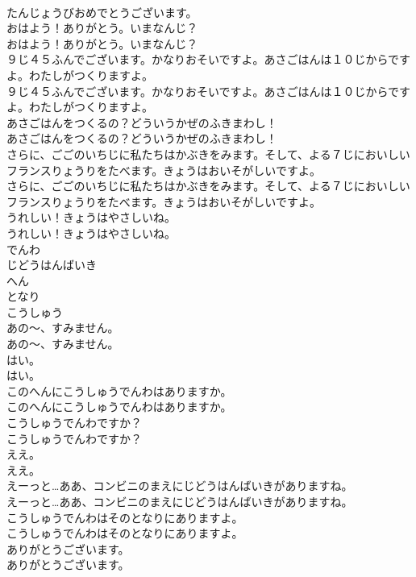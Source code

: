 \documentclass[8pt]{extreport}
\begin{document}
\begin{CJK}{UTF8}{min}
\\	たんじょうびおめでとうございます。 
\\	おはよう！ありがとう。いまなんじ？	
\\	おはよう！ありがとう。いまなんじ？ 
\\	９じ４５ふんでございます。かなりおそいですよ。あさごはんは１０じからですよ。わたしがつくりますよ。	
\\	９じ４５ふんでございます。かなりおそいですよ。あさごはんは１０じからですよ。わたしがつくりますよ。 
\\	あさごはんをつくるの？どういうかぜのふきまわし！	
\\	あさごはんをつくるの？どういうかぜのふきまわし！ 
\\	さらに、ごごのいちじに私たちはかぶきをみます。そして、よる７じにおいしいフランスりょうりをたべます。きょうはおいそがしいですよ。	
\\	さらに、ごごのいちじに私たちはかぶきをみます。そして、よる７じにおいしいフランスりょうりをたべます。きょうはおいそがしいですよ。 
\\	うれしい！きょうはやさしいね。	
\\	うれしい！きょうはやさしいね。 
\\	でんわ
\\	じどうはんばいき
\\	へん
\\	となり
\\	こうしゅう
\\	あの～、すみません。	
\\	あの～、すみません。 
\\	はい。	
\\	はい。 
\\	このへんにこうしゅうでんわはありますか。	
\\	このへんにこうしゅうでんわはありますか。 
\\	こうしゅうでんわですか？	
\\	こうしゅうでんわですか？ 
\\	ええ。	
\\	ええ。 
\\	えーっと…ああ、コンビニのまえにじどうはんばいきがありますね。	
\\	えーっと…ああ、コンビニのまえにじどうはんばいきがありますね。 
\\	こうしゅうでんわはそのとなりにありますよ。	
\\	こうしゅうでんわはそのとなりにありますよ。 
\\	ありがとうございます。	
\\	ありがとうございます。 

\end{CJK}
\end{document}
